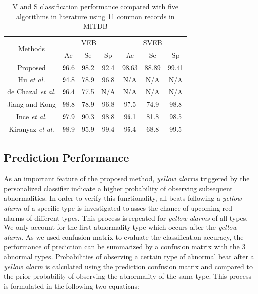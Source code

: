\begin{table}[tbp]
\centering
\caption{V and S classification performance compared with five algorithms in literature using 11 common records in MITDB}
\label{table:classification_comp}
\begin{tabular}{|c|c|c|c|c|c|c|}
\hline
\multirow{2}{*}{Methods} & \multicolumn{3}{c|}{VEB} & \multicolumn{3}{c|}{SVEB} \\ \cline{2-7} 
                         & Ac     & Se     & Sp     & Ac      & Se     & Sp     \\ \hline
Proposed                 & 96.6   & 98.2   & 92.4   & 98.63   & 88.89  & 99.41  \\ \hline
Hu \textit{et al.}\cite{Hu_et_al}     & 94.8   & 78.9   & 96.8   & N/A     & N/A    & N/A    \\ \hline
de Chazal \textit{et al.}\cite{autofs}  & 96.4   & 77.5   & N/A    & N/A     & N/A    & N/A    \\ \hline
Jiang and Kong \cite{bbnn}    & 98.8   & 78.9   & 96.8   & 97.5    & 74.9   & 98.8   \\ \hline
Ince \textit{et al.} \cite{ince2009generic}    & 97.9   & 90.3   & 98.8   & 96.1    & 81.8   & 98.5   \\ \hline
Kiranyaz \textit{et al.}\cite{Kiranyaz}         & 98.9   & 95.9   & 99.4   & 96.4    & 68.8   & 99.5   \\ \hline
\end{tabular}
\end{table}

\subsection{Prediction Performance}

As an important feature of the proposed method, \textit{yellow alarms} triggered by the personalized classifier indicate a higher probability of observing subsequent abnormalities. In order to verify this functionality, all beats following a \textit{yellow alarm} of a specific type is investigated to asses the chance of upcoming red alarms of different types. This process is repeated for \textit{yellow alarms} of all types. We only account for the first abnormality type which occurs after the \textit{yellow alarm}. As we used confusion matrix to evaluate the classification accuracy, the performance of prediction can be summarized by a confusion matrix with the 3 abnormal types. Probabilities of observing a certain type of abnormal beat after a \textit{yellow alarm} is calculated using the prediction confusion matrix and compared to the prior probability of observing the abnormality of the same type. This process is formulated in the following two equations:

